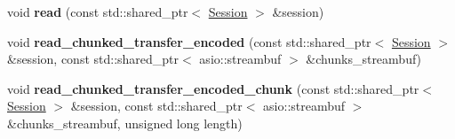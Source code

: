\begin{DoxyCompactItemize}
\item 
void {\bfseries read} (const std\+::shared\+\_\+ptr$<$ \hyperlink{classSimpleWeb_1_1ClientBase_1_1Session}{Session} $>$ \&session)\hypertarget{classSimpleWeb_1_1ClientBase_a16f3a8845be4c7a0ff2a5c67f6e76ab8}{}\label{classSimpleWeb_1_1ClientBase_a16f3a8845be4c7a0ff2a5c67f6e76ab8}

\item 
void {\bfseries read\+\_\+chunked\+\_\+transfer\+\_\+encoded} (const std\+::shared\+\_\+ptr$<$ \hyperlink{classSimpleWeb_1_1ClientBase_1_1Session}{Session} $>$ \&session, const std\+::shared\+\_\+ptr$<$ asio\+::streambuf $>$ \&chunks\+\_\+streambuf)\hypertarget{classSimpleWeb_1_1ClientBase_a23812e2e3ac267b4d3adaa25abc28068}{}\label{classSimpleWeb_1_1ClientBase_a23812e2e3ac267b4d3adaa25abc28068}

\item 
void {\bfseries read\+\_\+chunked\+\_\+transfer\+\_\+encoded\+\_\+chunk} (const std\+::shared\+\_\+ptr$<$ \hyperlink{classSimpleWeb_1_1ClientBase_1_1Session}{Session} $>$ \&session, const std\+::shared\+\_\+ptr$<$ asio\+::streambuf $>$ \&chunks\+\_\+streambuf, unsigned long length)\hypertarget{classSimpleWeb_1_1ClientBase_a99fd2afcea8880542bceacc07de42c5a}{}\label{classSimpleWeb_1_1ClientBase_a99fd2afcea8880542bceacc07de42c5a}

\end{DoxyCompactItemize}

